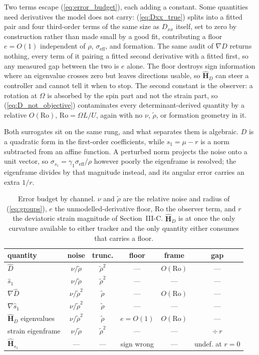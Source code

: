 \documentclass[lettersize,journal]{IEEEtran}
\begin{document}
Two terms escape (\ref{eq:error_budget}), each adding a constant. Some
quantities need derivatives the model does not carry:
(\ref{eq:Dxx_true}) splits into a fitted pair and four third-order terms
of the same size as $D_{xx}$ itself, set to zero by construction rather
than made small by a good fit, contributing a floor $e = O(1)$
independent of $\rho$, $\sigma_{\mathrm{eff}}$, and formation.
The same audit of $\nabla D$ returns nothing, every term of it pairing a
fitted second derivative with a fitted first, so any measured gap
between the two is $e$ alone. The floor destroys sign information where
an eigenvalue crosses zero but leaves directions usable, so
$\hat{\mathbf{H}}_D$ can steer a controller and cannot tell it when to
stop. The second constant
is the observer: a rotation at $\Omega$ is absorbed by the spin part and
not the strain part, so (\ref{eq:D_not_objective}) contaminates every
determinant-derived quantity by a relative $O(\mathrm{Ro})$,
$\mathrm{Ro} = \Omega L/U$, again with no $\nu$, $\tilde{\rho}$, or
formation geometry in it.

Both surrogates sit on the same rung, and what separates them is
algebraic. $D$ is a quadratic form in the first-order coefficients,
while $s_1 = \mu - r$ is a norm subtracted from an affine function. A
perturbed norm projects the noise onto a unit vector, so $\sigma_{s_1} =
\gamma_1\sigma_{\mathrm{eff}}/\rho$ however poorly the eigenframe is
resolved; the eigenframe divides by that magnitude instead, and its
angular error carries an extra $1/r$.

\begin{table}[!t]
\centering
\caption{Error budget by channel. $\nu$ and $\tilde{\rho}$ are the
relative noise and radius of (\ref{eq:groups}), $e$ the
unmodelled-derivative floor, $\mathrm{Ro}$ the observer term, and $r$
the deviatoric strain magnitude of Section~\mbox{III-C}.
$\hat{\mathbf{H}}_D$ is at once the only curvature available to either
tracker and the only quantity either consumes that carries a floor.}
\label{tab:budget}
\footnotesize
\setlength{\tabcolsep}{4pt}
\begin{tabular}{@{}lccccc@{}}
\hline
quantity & noise & trunc. & floor & frame & gap \\
\hline
$\hat{D}$ & $\nu/\tilde{\rho}$ & $\tilde{\rho}^2$ & --- & $O(\mathrm{Ro})$ & --- \\
$\hat{s}_1$ & $\nu/\tilde{\rho}$ & $\tilde{\rho}^2$ & --- & --- & --- \\
$\nabla\hat{D}$ & $\nu/\tilde{\rho}^2$ & $\tilde{\rho}$ & --- & $O(\mathrm{Ro})$ & --- \\
$\nabla\hat{s}_1$ & $\nu/\tilde{\rho}^2$ & $\tilde{\rho}$ & --- & --- & --- \\
$\hat{\mathbf{H}}_D$ eigenvalues & $\nu/\tilde{\rho}^2$ & $\tilde{\rho}$ & $e = O(1)$ & $O(\mathrm{Ro})$ & --- \\
strain eigenframe & $\nu/\tilde{\rho}$ & $\tilde{\rho}^2$ & --- & --- & $\div\,r$ \\
$\hat{\mathbf{H}}_{s_1}$ & --- & --- & sign wrong & --- & undef. at $r=0$ \\
\hline
\end{tabular}
\end{table}
\end{document}
